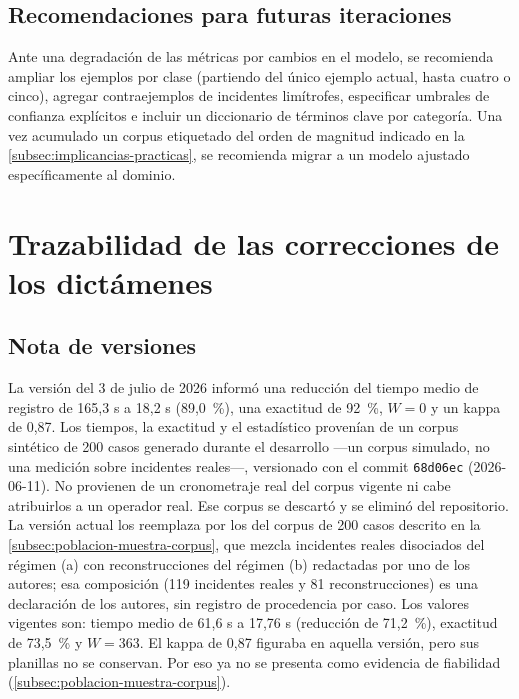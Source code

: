 \subsection{Recomendaciones para futuras iteraciones}\label{subsec:anexo-recomendaciones-prompt}

Ante una degradación de las métricas por cambios en el modelo, se recomienda ampliar los ejemplos por clase (partiendo del único ejemplo actual, hasta cuatro o cinco), agregar contraejemplos de incidentes limítrofes, especificar umbrales de confianza explícitos e incluir un diccionario de términos clave por categoría. Una vez acumulado un corpus etiquetado del orden de magnitud indicado en la \autoref{subsec:implicancias-practicas}, se recomienda migrar a un modelo ajustado específicamente al dominio.

\section{Trazabilidad de las correcciones de los dictámenes}\label{sec:anexo-trazabilidad}

\subsection{Nota de versiones}\label{subsec:nota-versiones}

La versión del 3 de julio de 2026 informó una reducción del tiempo medio de registro de 165,3 s a 18,2 s (89,0~\%), una exactitud de 92~\%, \(W = 0\) y un kappa de 0,87. Los tiempos, la exactitud y el estadístico provenían de un corpus sintético de 200 casos generado durante el desarrollo ---un corpus simulado, no una medición sobre incidentes reales---, versionado con el commit \texttt{68d06ec} (2026-06-11). No provienen de un cronometraje real del corpus vigente ni cabe atribuirlos a un operador real. Ese corpus se descartó y se eliminó del repositorio. La versión actual los reemplaza por los del corpus de 200 casos descrito en la \autoref{subsec:poblacion-muestra-corpus}, que mezcla incidentes reales disociados del régimen (a) con reconstrucciones del régimen (b) redactadas por uno de los autores; esa composición (119 incidentes reales y 81 reconstrucciones) es una declaración de los autores, sin registro de procedencia por caso. Los valores vigentes son: tiempo medio de 61,6 s a 17,76 s (reducción de 71,2~\%), exactitud de 73,5~\% y \(W = 363\). El kappa de 0,87 figuraba en aquella versión, pero sus planillas no se conservan. Por eso ya no se presenta como evidencia de fiabilidad (\autoref{subsec:poblacion-muestra-corpus}).


